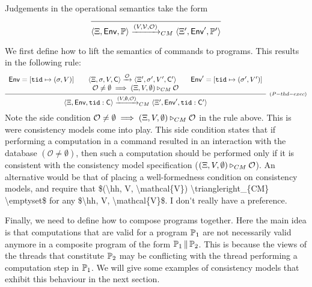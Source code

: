 \documentclass[a4paper,UKenglish]{article}%
\theoremstyle{plain}
\begin{document}
Judgements in the operational semantics take the form 
\[
\infer{\langle \hh, \mathsf{Env}, \prog \rangle \xrightarrow{(V, \mathcal{V}, \mathcal{O})}_{CM} \langle \hh', \mathsf{Env}', \prog' \rangle}{}
\]

We first define how to lift the semantics of commands to programs. This results 
in the following rule: 
\[
\infer[{\scriptstyle(P-thd-exec)}]{\langle \hh, \mathsf{Env}, \tid: \cmd \rangle \xrightarrow{(V, \emptyset, \mathcal{O})}_{CM} \langle \hh', \mathsf{Env}', \tid: \cmd' \rangle}
{
\begin{array}{c}
\mathsf{Env} = [\tid \mapsto (\sigma, V)] \qquad \langle \hh, \thdstack, V, \cmd \rangle \xrightarrow{\mathcal{O}} \langle \hh', \thdstack', V', \cmd' \rangle 
\qquad \mathsf{Env}' = [\tid \mapsto (\sigma', V')]\\
\mathcal{O} \neq \emptyset \implies (\hh, V, \emptyset) \triangleright_{CM} \mathcal{O}
\end{array}
}
\]
Note the side condition $\mathcal{O} \neq \emptyset \implies (\Xi, V, \emptyset) \triangleright_{CM} \mathcal{O}$ in the rule above. 
This is were consistency models come into play. This side condition states that if performing a computation 
in a command resulted in an interaction with the database $(\mathcal{O} \neq \emptyset)$, then such a computation 
should be performed only if it is consistent with the consistency model specification ($(\Xi, V, \emptyset) \triangleright_{CM} \mathcal{O}$).
\ac{An alternative would be that of placing a well-formedness condition on consistency models, 
and require that $(\hh, V, \mathcal{V}) \triangleright_{CM} \emptyset$ for any $\hh, V, \mathcal{V}$. 
I don't really have a preference.}


Finally, we need to define how to compose programs together. 
Here the main idea is that computations that are valid for a 
program $\mathbb{P}_1$ are not necessarily valid anymore in 
a composite program of the form $\mathbb{P}_1 \mathop{\lVert} \mathbb{P}_2$. 
This is because the views of the threads that constitute $\mathbb{P}_2$ 
may be conflicting with the thread performing a computation step in 
$\mathbb{P}_1$. We will give some examples of consistency models 
that exhibit this behaviour in the next section. 
\end{document}
